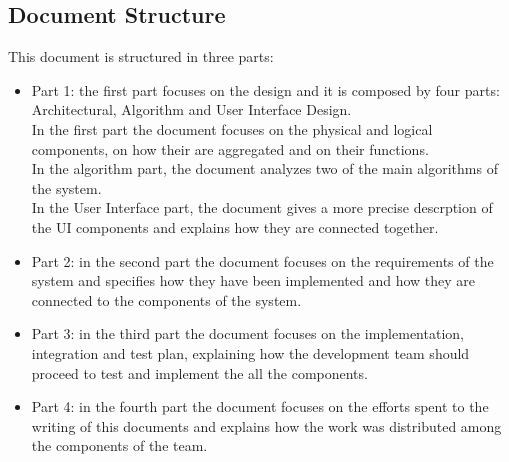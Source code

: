 \subsection{Document Structure}
This document is structured in three parts:
\begin{itemize}
\item
Part 1: the first part focuses on the design and it is composed by four parts: Architectural, Algorithm and User Interface Design.\\
In the first part the document focuses on the physical and logical components, on how their are aggregated and on their functions.\\
In the algorithm part, the document analyzes two of the main algorithms of the system.\\
In the User Interface part, the document gives a more precise descrption of the UI components and explains how they are connected together.
\item
Part 2: in the second part the document focuses on the requirements of the system and specifies how they have been implemented and how they are connected to the components of the system.
\item
Part 3: in the third part the document focuses on the implementation, integration and test plan, explaining how the development team should proceed to test and implement the all the components.
\item
Part 4: in the fourth part the document focuses on the efforts spent to the writing of this documents and explains how the work was distributed among the components of the team.
\end{itemize}
